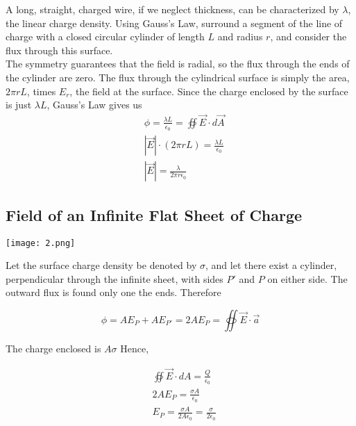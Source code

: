 \documentclass[svgnames]{article}
\begin{document}
\vspace{10px}


A long, straight, charged wire, if we neglect thickness, can be characterized by $\lambda$, the linear charge density. Using Gauss's Law, surround a segment of the line of charge with a closed circular cylinder of length $L$ and radius $r$, and consider the flux through this surface. \\

The symmetry guarantees that the field is radial, so the flux through the ends of the cylinder are zero. The flux through the cylindrical surface is simply the area, $2\pi rL$, times $E_r$, the field at the surface. Since the charge enclosed by the surface is just $\lambda L$, Gauss's Law gives us \\

\begin{align*}
 & \phi = \frac{\lambda L}{\epsilon_0} = \oiint \vec{E} \cdot d\vec{A} \\
 & |\vec{E}| \cdot (2 \pi r L) = \frac{\lambda L}{\epsilon_0} \\
 & |\vec{E}| = \frac{\lambda}{2\pi r \epsilon_0}
\end{align*}  

\subsection{Field of an Infinite Flat Sheet of Charge}

\vspace{20px}
\begin{center}
\texttt{[image: 2.png]}
\end{center} 
\vspace{20px}

Let the surface charge density be denoted by $\sigma$, and let there exist a cylinder, perpendicular through the infinite sheet, with sides $P'$ and $P$ on either side. The outward flux is found only one the ends. Therefore

\[\phi =  AE_P + AE_{P'} = 2AE_P =\oiint \vec{E} \cdot \vec{a} \] 

The charge enclosed is $A\sigma$ Hence, 

\begin{align*}
&\oiint \vec{E} \cdot dA = \frac{Q}{\epsilon_0} \\ 
&2AE_P = \frac{\sigma A}{\epsilon_0} \\
&E_P = \frac{\sigma A}{2A \epsilon_0} = \frac{\sigma}{2 \epsilon_0}
\end{align*} \\
\end{document}
